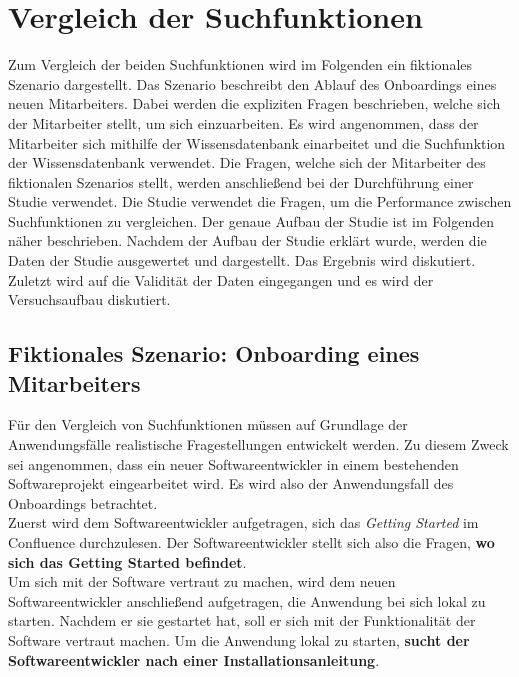 \chapter{Vergleich der Suchfunktionen}
\label{chap:vergleich-der-suchfunktionen}

Zum Vergleich der beiden Suchfunktionen wird im Folgenden ein fiktionales Szenario dargestellt.
Das Szenario beschreibt den Ablauf des Onboardings eines neuen Mitarbeiters.
Dabei werden die expliziten Fragen beschrieben, welche sich der Mitarbeiter stellt, um sich einzuarbeiten.
Es wird angenommen, dass der Mitarbeiter sich mithilfe der Wissensdatenbank einarbeitet und die Suchfunktion der Wissensdatenbank verwendet.
Die Fragen, welche sich der Mitarbeiter des fiktionalen Szenarios stellt, werden anschließend bei der Durchführung einer Studie verwendet.
Die Studie verwendet die Fragen, um die Performance zwischen Suchfunktionen zu vergleichen.
Der genaue Aufbau der Studie ist im Folgenden näher beschrieben.
Nachdem der Aufbau der Studie erklärt wurde, werden die Daten der Studie ausgewertet und dargestellt.
Das Ergebnis wird diskutiert.
Zuletzt wird auf die Validität der Daten eingegangen und es wird der Versuchsaufbau diskutiert.

\section{Fiktionales Szenario: Onboarding eines Mitarbeiters}

Für den Vergleich von Suchfunktionen müssen auf Grundlage der Anwendungsfälle realistische Fragestellungen entwickelt werden.
Zu diesem Zweck sei angenommen, dass ein neuer Softwareentwickler in einem bestehenden Softwareprojekt eingearbeitet wird.
Es wird also der Anwendungsfall des Onboardings betrachtet.\\

Zuerst wird dem Softwareentwickler aufgetragen, sich das \textit{Getting Started} im Confluence durchzulesen.
Der Softwareentwickler stellt sich also die Fragen, \textbf{wo sich das Getting Started befindet}.\\

Um sich mit der Software vertraut zu machen, wird dem neuen Softwareentwickler anschließend aufgetragen, die Anwendung bei sich lokal zu starten.
Nachdem er sie gestartet hat, soll er sich mit der Funktionalität der Software vertraut machen.
Um die Anwendung lokal zu starten, \textbf{sucht der Softwareentwickler nach einer Installationsanleitung}.\\

